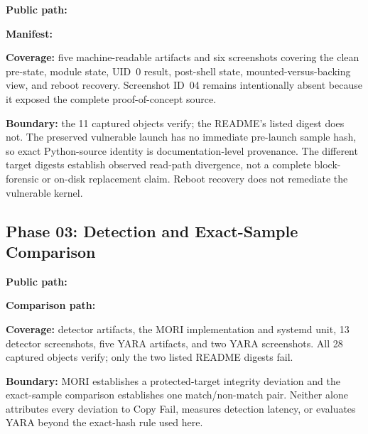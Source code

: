 \begin{evidencebox}
\textbf{Public path:} 

\textbf{Manifest:} 

\textbf{Coverage:} five machine-readable artifacts and six screenshots
covering the clean pre-state, module state, UID~0 result, post-shell state,
mounted-versus-backing view, and reboot recovery. Screenshot ID~04 remains
intentionally absent because it exposed the complete proof-of-concept source.

\textbf{Boundary:} the 11 captured objects verify; the README's listed digest
does not. The preserved vulnerable launch has no immediate pre-launch sample
hash, so exact Python-source identity is documentation-level provenance. The
different target digests establish observed read-path divergence, not a complete
block-forensic or on-disk replacement claim. Reboot recovery does not remediate
the vulnerable kernel.
\end{evidencebox}

\clearpage

\subsection{Phase 03: Detection and Exact-Sample Comparison}
\label{app:evidence-phase03}

\begin{evidencebox}
\textbf{Public path:} 

\textbf{Comparison path:}

\textbf{Coverage:} detector artifacts, the MORI implementation and systemd
unit, 13 detector screenshots, five YARA artifacts, and two YARA screenshots.
All 28 captured objects verify; only the two listed README digests fail.

\textbf{Boundary:} MORI establishes a protected-target integrity deviation and
the exact-sample comparison establishes one match/non-match pair. Neither alone
attributes every deviation to Copy Fail, measures detection latency, or
evaluates YARA beyond the exact-hash rule used here.
\end{evidencebox}

